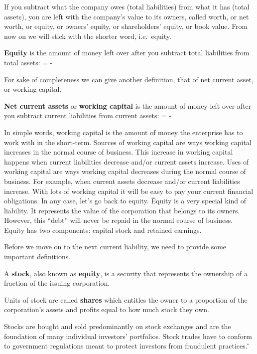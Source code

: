If you subtract what the company owes (total liabilities) from what it has (total assets), you are left with the
company's value to its owners, called worth, or net worth, or equity, or owners' equity, or shareholders' equity,
or book value. From now on we will stick with the shorter word, i.e.\ equity.

\bd[Equity]
\textbf{Equity} is the amount of money left over after you subtract total liabilities from total assets:
\bse
{} =  - 
\ese
\ed

For sake of completeness we can give another definition, that of net current asset, or working capital.

\textbf{Net current assets} or \textbf{working capital} is the amount of money left over after you subtract current
liabilities from current assets:
\bse
{} =  - 
\ese
\ed

In simple words, working capital is the amount of money the enterprise has to work with in the short-term. Sources of
working capital are ways working capital increases in the normal course of business. This increase in working capital
happens when current liabilities decrease and/or current assets increase. Uses of working capital are ways working
capital decreases during the normal course of business. For example, when current assets decrease and/or current
liabilities increase. With lots of working capital it will be easy to pay your current financial obligations. In any
case, let's go back to equity. \v

Equity is a very special kind of liability. It represents the value of the corporation that belongs to its owners.
However, this ``debt'' will never be repaid in the normal course of business. Equity has two components: capital
stock and retained earnings.

Before we move on to the next current liability, we need to provide some important definitions.

A \textbf{stock}, also known as \textbf{equity}, is a security that represents the ownership of a fraction of the
issuing corporation.
\ed

\bd[Share]
Units of stock are called \textbf{shares} which entitles the owner to a proportion of the corporation's
assets and profits equal to how much stock they own.
\ed

Stocks are bought and sold predominantly on stock exchanges and are the foundation of many individual investors'
portfolios. Stock trades have to conform to government regulations meant to protect investors from fraudulent practices.
\v

